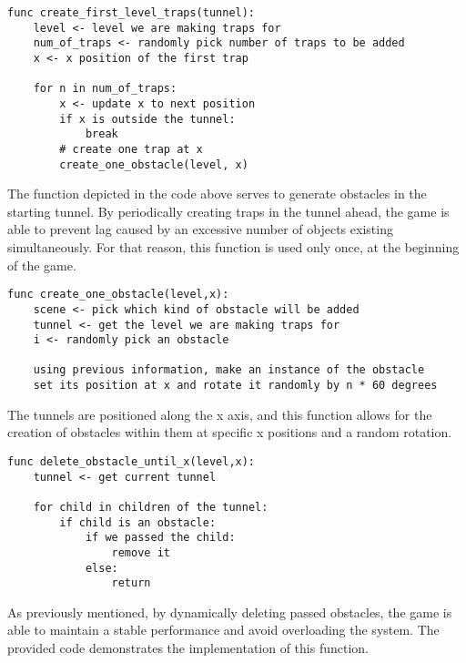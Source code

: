 \begin{lstlisting} 
func create_first_level_traps(tunnel):
    level <- level we are making traps for
    num_of_traps <- randomly pick number of traps to be added
    x <- x position of the first trap
    
    for n in num_of_traps:
        x <- update x to next position
        if x is outside the tunnel:
            break
        # create one trap at x
        create_one_obstacle(level, x) 
\end{lstlisting}

The function depicted in the code above serves to generate obstacles in the starting tunnel. By periodically creating traps in the tunnel ahead, the game is able to prevent lag caused by an excessive number of objects existing simultaneously. For that reason, this function is used only once, at the beginning of the game.

\begin{lstlisting} 
func create_one_obstacle(level,x):
    scene <- pick which kind of obstacle will be added
    tunnel <- get the level we are making traps for
    i <- randomly pick an obstacle
    
    using previous information, make an instance of the obstacle
    set its position at x and rotate it randomly by n * 60 degrees  
\end{lstlisting}

The tunnels are positioned along the x axis, and this function allows for the creation of obstacles within them at specific x positions and a random rotation.

\begin{lstlisting}           
func delete_obstacle_until_x(level,x):
    tunnel <- get current tunnel

    for child in children of the tunnel:
        if child is an obstacle:
            if we passed the child:
                remove it
            else:
                return
\end{lstlisting}

As previously mentioned, by dynamically deleting passed obstacles, the game is able to maintain a stable performance and avoid overloading the system. The provided code demonstrates the implementation of this function.
